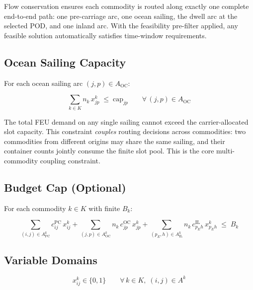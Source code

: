 \documentclass[11pt,a4paper]{article}
\theoremstyle{definition}
\begin{document}
Flow conservation ensures each commodity is routed along exactly one complete
end-to-end path: one pre-carriage arc, one ocean sailing, the dwell arc at the
selected POD, and one inland arc. With the feasibility pre-filter applied, any
feasible solution automatically satisfies time-window requirements.

\subsection{Ocean Sailing Capacity}

For each ocean sailing arc $(j, p) \in A_{\text{OC}}$:

\begin{equation}
  \sum_{k \in K} n_k\, x_{jp}^k \;\leq\; \text{cap}_{jp}
  \qquad \forall\, (j,p) \in A_{\text{OC}}
  \label{eq:cap}
\end{equation}

The total FEU demand on any single sailing cannot exceed the carrier-allocated slot
capacity. This constraint \emph{couples} routing decisions across commodities: two
commodities from different origins may share the same sailing, and their container
counts jointly consume the finite slot pool. This is the core multi-commodity
coupling constraint.

\subsection{Budget Cap (Optional)}

For each commodity $k \in K$ with finite $B_k$:

\begin{equation}
  \sum_{(i,j) \in A^k_{\text{PC}}} c_{ij}^{\text{PC}}\, x_{ij}^k
  + \sum_{(j,p) \in A^k_{\text{OC}}} n_k\, c_{jp}^{\text{OC}}\, x_{jp}^k
  + \sum_{(p_E,h) \in A^k_{\text{IL}}} n_k\, c_{p_E h}^{\text{IL}}\, x_{p_E h}^k
  \;\leq\; B_k
  \label{eq:budget}
\end{equation}

\subsection{Variable Domains}

\begin{equation}
  x_{ij}^k \in \{0, 1\} \qquad \forall\, k \in K,\; (i,j) \in A^k
  \label{eq:domain}
\end{equation}

\end{document}
